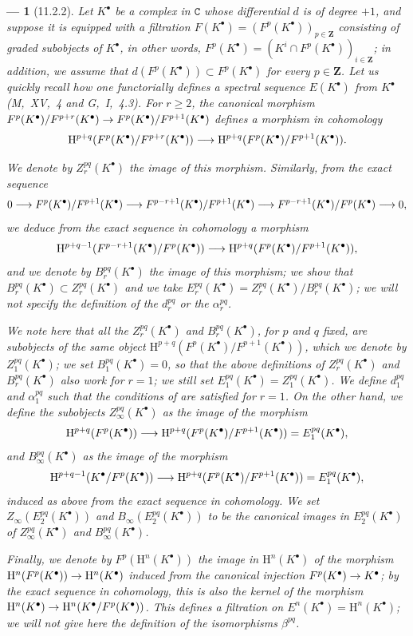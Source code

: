 \documentclass[oneside]{amsart}
\theoremstyle{ega-env-style}
\newtheorem*{env}{---}
\theoremstyle{ega-thm-env-style}
\theoremstyle{ega-defn-env-style}
\def\bb{\mathbf}                    %
\def\cat{\mathtt}                   %
\def\geq{\geqslant}                 %
\def\HH{\mathrm{H}}                 %
\renewcommand{\to}{\mathchoice{\longrightarrow}{\rightarrow}{\rightarrow}{\rightarrow}}
\newcommand{\oldpage}[2][]{{\marginnote{\normalfont{\textbf{#1}~|~#2}}}\ignorespaces}
\let\EGAOriginalLabel\label
\renewcommand{\label}[1]{\phantomsection\EGAOriginalLabel{#1}}
\begin{document}
\begin{env}[11.2.2]
\label{0.11.2.2}
Let $K^\bullet$ be a complex in $\cat{C}$ whose differential $d$ is of degree $+1$, and suppose it is equipped with a \emph{filtration $F(K^\bullet)=(F^p(K^\bullet))_{p\in\bb{Z}}$} consisting of \emph{graded} subobjects
\oldpage[0\textsubscript{III}]{28}
of $K^\bullet$, in other words, $F^p(K^\bullet)=(K^i\cap F^p(K^\bullet))_{i\in\bb{Z}}$; in addition, we assume that $d(F^p(K^\bullet))\subset F^p(K^\bullet)$ for every $p\in\bb{Z}$.
Let us quickly recall how one \emph{functorially} defines a spectral sequence $E(K^\bullet)$ from $K^\bullet$ (M,~XV,~4 and G,~I,~4.3).
For $r\geq 2$, the canonical morphism $F^p(K^\bullet)/F^{p+r}(K^\bullet)\to F^p(K^\bullet)/F^{p+1}(K^\bullet)$ defines a morphism in cohomology
\[
  \HH^{p+q}(F^p(K^\bullet)/F^{p+r}(K^\bullet))\to\HH^{p+q}(F^p(K^\bullet)/F^{p+1}(K^\bullet)).
\]

We denote by $Z_r^{pq}(K^\bullet)$ the image of this morphism.
Similarly, from the exact sequence
\[
  0\to F^p(K^\bullet)/F^{p+1}(K^\bullet)\to F^{p-r+1}(K^\bullet)/F^{p+1}(K^\bullet)\to F^{p-r+1}(K^\bullet)/F^p(K^\bullet)\to 0,
\]
we deduce from the exact sequence in cohomology a morphism
\[
  \HH^{p+q-1}(F^{p-r+1}(K^\bullet)/F^p(K^\bullet))\to\HH^{p+q}(F^p(K^\bullet)/F^{p+1}(K^\bullet)),
\]
and we denote by $B_r^{pq}(K^\bullet)$ the image of this morphism; we show that $B_r^{pq}(K^\bullet)\subset Z_r^{pq}(K^\bullet)$ and we take $E_r^{pq}(K^\bullet)=Z_r^{pq}(K^\bullet)/B_r^{pq}(K^\bullet)$; we will not specify the definition of the $d_r^{pq}$ or the $\alpha_r^{pq}$.

We note here that all the $Z_r^{pq}(K^\bullet)$ and $B_r^{pq}(K^\bullet)$, for $p$ and $q$ fixed, are subobjects of the same object $\HH^{p+q}(F^p(K^\bullet)/F^{p+1}(K^\bullet))$, which we denote by $Z_1^{pq}(K^\bullet)$; we set $B_1^{pq}(K^\bullet)=0$, so that the above definitions of $Z_r^{pq}(K^\bullet)$ and $B_r^{pq}(K^\bullet)$ also work for $r=1$; we still set $E_1^{pq}(K^\bullet)=Z_1^{pq}(K^\bullet)$.
We define $d_1^{pq}$ and $\alpha_1^{pq}$ such that the conditions of  are satisfied for $r=1$.
On the other hand, we define the subobjects $Z_\infty^{pq}(K^\bullet)$ as the image of the morphism
\[
  \HH^{p+q}(F^p(K^\bullet))\to\HH^{p+q}(F^p(K^\bullet)/F^{p+1}(K^\bullet))=E_1^{pq}(K^\bullet),
\]
and $B_\infty^{pq}(K^\bullet)$ as the image of the morphism
\[
  \HH^{p+q-1}(K^\bullet/F^p(K^\bullet))\to\HH^{p+q}(F^p(K^\bullet)/F^{p+1}(K^\bullet))=E_1^{pq}(K^\bullet),
\]
induced as above from the exact sequence in cohomology.
We set $Z_\infty(E_2^{pq}(K^\bullet))$ and $B_\infty(E_2^{pq}(K^\bullet))$ to be the canonical images in $E_2^{pq}(K^\bullet)$ of $Z_\infty^{pq}(K^\bullet)$ and $B_\infty^{pq}(K^\bullet)$.

Finally, we denote by $F^p(\HH^n(K^\bullet))$ the image in $\HH^n(K^\bullet)$ of the morphism $\HH^n(F^p(K^\bullet))\to\HH^n(K^\bullet)$ induced from the canonical injection $F^p(K^\bullet)\to K^\bullet$; by the exact sequence in cohomology, this is also the kernel of the morphism $\HH^n(K^\bullet)\to\HH^n(K^\bullet/F^p(K^\bullet))$.
This defines a filtration on $E^n(K^\bullet)=\HH^n(K^\bullet)$; we will not give here the definition of the isomorphisms $\beta^{pq}$.
\end{env}
\end{document}

